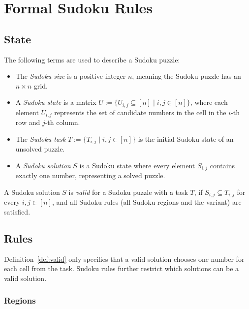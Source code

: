 \chapter{Formal Sudoku Rules}\label{ch:3}

\section{State}\label{sec:state}

\begin{defn}
    The following terms are used to describe a Sudoku puzzle:
    \begin{itemize}
        \item The \emph{Sudoku size} is a positive integer $n$, meaning the Sudoku puzzle has an $n \times n$ grid.
        \item A \emph{Sudoku state} is a matrix $U := \{U_{i,j} \subseteq [n] \mid i, j \in [n]\}$,
            where each element $U_{i,j}$ represents the set of candidate numbers
            in the cell in the $i$-th row and $j$-th column.
        \item The \emph{Sudoku task} $T := \{T_{i,j} \mid i, j \in [n]\}$ is the initial
            Sudoku state of an unsolved puzzle.
        \item A \emph{Sudoku solution} $S$ is a Sudoku state where every element $S_{i,j}$ contains exactly one number,
            representing a solved puzzle.
    \end{itemize}
\end{defn}

\begin{defn}\label{def:valid}
    A Sudoku solution $S$ is \emph{valid} for a Sudoku puzzle with a task $T$, if
    $S_{i,j} \subseteq T_{i,j}$ for every $i, j \in [n]$, and
    all Sudoku rules (all Sudoku regions and the variant) are satisfied.
\end{defn}

\section{Rules}

Definition~\ref{def:valid} only specifies that a valid solution chooses one number for each cell from the task.
Sudoku rules further restrict which solutions can be a valid solution.

\subsection*{Regions}


